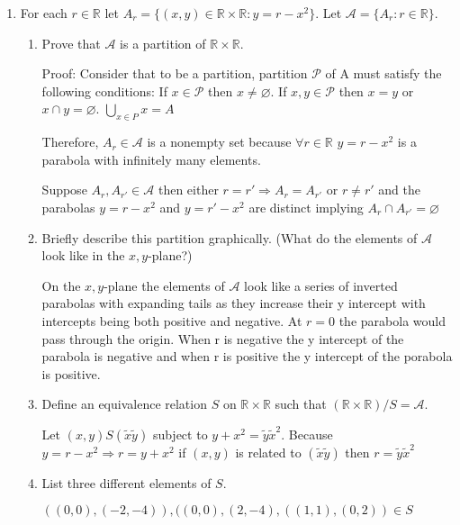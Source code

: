 \documentclass{article}
\newcommand{\bR}{\mathbb{R}}
\begin{document}
{\begin{enumerate}[labelindent=0pt,leftmargin=0pt]
    Therefore, $R_{24}=R_{12}\circ R_8$.

    \item For each $r\in\bR$ let $A_r=\{(x,y)\in\bR\times\bR:y=r-x^2\}$. Let $\mathcal{A}=\{A_r:r\in\bR\}$.\begin{enumerate}
    \item Prove that $\mathcal{A}$ is a partition of $\bR\times\bR$.

    Proof: 
    Consider that to be a partition, partition $\mathcal{P}$ of A must satisfy the following conditions:
    If $x \in \mathcal{P}$ then $x \neq \varnothing$.
    If $x,y \in \mathcal{P}$ then $x=y$ or $x\cap y = \varnothing$.
    $\bigcup_{x \in P} x = A$

    Therefore, $A_r\in \mathcal{A}$ is a nonempty set because $\forall r \in\bR$ $y = r-x^2$ is a parabola with infinitely many elements. 

    Suppose $A_r,A_{r'}\in \mathcal{A} $ then either $r=r' \Rightarrow A_r = A_{r'}$  or $r\neq r'$ and the parabolas 
    $y=r-x^2$ and $y=r'-x^2$ are distinct implying $A_r \cap A_{r'} = \varnothing$ 
    
    \item Briefly describe this partition graphically. (What do the elements of $\mathcal{A}$ look like in the $x,y$-plane?)

    On the $x,y$-plane the elements of $\mathcal{A}$ look like a series of inverted parabolas with expanding tails as they increase their y intercept with intercepts being both positive and negative. At $r=0$ the parabola would pass through the origin. When r is negative the y intercept of the parabola is negative and when r is positive the y intercept of the porabola is positive. 
    
    \item Define an equivalence relation $S$ on $\bR\times\bR$ such that $(\bR\times\bR)/S=\mathcal{A}$.

    Let $(x,y)S(\tilde{x} \tilde{y})$ subject to $y+x^2 = \tilde{y} \tilde{x}^2$.
    Because $y=r-x^2 \Rightarrow r=y+x^2$ if $(x,y)$ is related to $(\tilde{x} \tilde{y})$ then $r= \tilde{y} \tilde{x}^2$
    
    \item List three different elements of $S$.

    $((0,0),(-2,-4)),((0,0),(2,-4),((1,1),(0,2))\in S$
    
    \end{enumerate}

    \end{enumerate}

}
\end{document}
